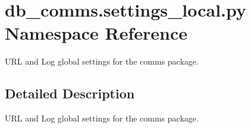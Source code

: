 \hypertarget{namespacedb__comms_1_1settings__local_1_1py}{}\section{db\+\_\+comms.\+settings\+\_\+local.\+py Namespace Reference}
\label{namespacedb__comms_1_1settings__local_1_1py}


U\+R\+L and Log global settings for the comms package.  




\subsection{Detailed Description}
U\+R\+L and Log global settings for the comms package. 

